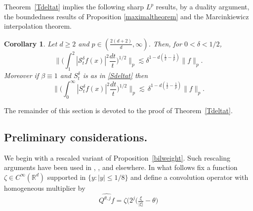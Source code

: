 \documentclass[11pt]{amsart}
\newtheorem{corollary}[theorem]{Corollary}
\theoremstyle{definition}
\numberwithin{theorem}{section}
\numberwithin{definition}{section}
\newcommand{\Be}{\begin{equation}}
\newcommand{\Ee}{\end{equation}}
\newcommand{\note}[1]{\footnote{\texttt{\Small #1}}}
\def\lc{\lesssim}
\def\bbR{{\mathbb {R}}}
\def\cK{{\mathcal {K}}}
\def\cS{{\mathcal {S}}}
\begin{document}
Theorem~\ref{Tdeltat}  implies the following sharp $L^p$ results,
by  a duality argument, the boundedness results of Proposition
\ref{maximaltheorem} and the Marcinkiewicz interpolation theorem.
 
\begin{corollary} \label{Tdeltatcor}
Let $d\ge 2$ and $p\in(\frac{2(d+2)}{d},\infty)$. Then, for $0<\delta<1/2$,
$$
\Big\|\Big(\int_{1}^2|\cS^\delta_tf(x)|^2\frac{dt}{t}\Big)^{1/2}\Big\|_p \lc
\delta^{1-d(\frac 12-\frac 1p)} \|f\|_p.
$$
Moreover if $\beta\equiv 1$ and $S^\delta_t$ is as in
\eqref{Sdeltat}
then
$$
\Big\| \Big(\int_{0}^\infty|S^\delta_tf(x)|^2\frac{dt}{t}\Big)^{1/2}\Big\|_p\lc \,
\delta^{1-d(\frac 12-\frac 1p)} \|f\|_p.
$$
\end{corollary}
The remainder of this section is devoted to the proof of
Theorem~\ref{Tdeltat}.

\subsection*{Preliminary considerations.}
We  begin with a rescaled variant of Proposition~\ref{bilweight}.
Such rescaling arguments
have been used in \cite{tavave}, \cite{ta}, \cite{le} and elsewhere.
In what follows fix a function
$\zeta\in C^\infty(\bbR^{d})$ supported in $\{y: |y|\le 1/8\}$ and define
a convolution operator with homogeneous multiplier by
\Be\label{Qjth}\widehat {Q^{\theta,j} f} =\zeta\big(2^j\big(\tfrac {\xi}{|\xi|}-\theta\big)
\Ee
\end{document}

